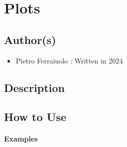 \documentclass[letterpaper,10pt,english]{sphinxmanual}
\begin{document}
\sphinxstepscope


\chapter{Plots}
\label{\detokenize{plots:module-ggcas.plots}}\label{\detokenize{plots:plots}}\label{\detokenize{plots::doc}}

\section{Author(s)}
\label{\detokenize{plots:author-s}}\begin{itemize}
\item {} 
\sphinxAtStartPar
Pietro Ferraiuolo : Written in 2024

\end{itemize}


\section{Description}
\label{\detokenize{plots:description}}

\section{How to Use}
\label{\detokenize{plots:how-to-use}}\subsubsection*{Examples}
\end{document}
